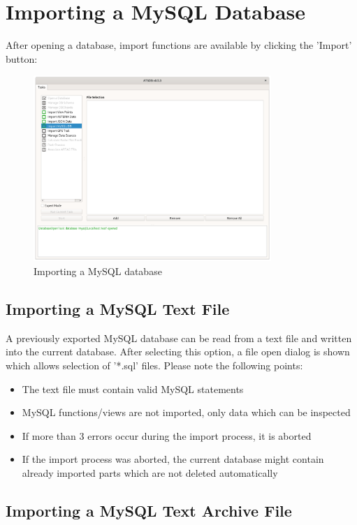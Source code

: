 \section{Importing a MySQL Database}
\label{sec:mysql_import}

After opening a database, import functions are available by clicking the 'Import' button:

\begin{figure}[H]
  \center
    \includegraphics[width=9cm,frame]{../screenshots/database_import.png}
  \caption{Importing a MySQL database}
\end{figure}

\subsection{Importing a MySQL Text File}

A previously exported MySQL database can be read from a text file and written into the current database. After selecting this option, a file open dialog is shown which allows selection of '*.sql' files. Please note the following points:

\begin{itemize}  
\item The text file must contain valid MySQL statements
\item MySQL functions/views are not imported, only data which can be inspected
\item If more than 3 errors occur during the import process, it is aborted
\item If the import process was aborted, the current database might contain already imported parts which are not deleted automatically
\end{itemize}

\subsection{Importing a MySQL Text Archive File}

